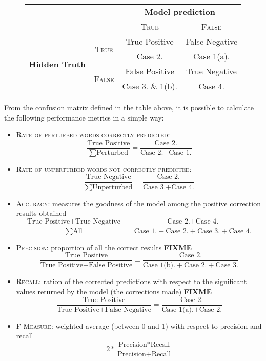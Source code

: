 \begin{figure}[H]
	\centering
	\begin{tabular}{lc|cc}
		\toprule
		& & \multicolumn{2}{c}{\textbf{Model prediction}}\\
		& & \textsc{True}  & \textsc{False} \\
		\midrule
		\multirow{4}{*}{\textbf{Hidden Truth}} 
		& \multirow{2}{*}{\textsc{True}}   & True Positive & False Negative	\\ 
			& & Case 2. & Case 1(a).	\\ 
		& \multirow{2}{*}{\textsc{False}}  & False Positive & True Negative	\\
		& &  Case 3. \& 1(b).  & Case 4.	\\ 
		\bottomrule
	\end{tabular}
	\label{tab:confmat}
\end{figure}

From the confusion matrix defined in the table above, it is possible to calculate the following performance 
metrics in a simple way:
\begin{itemize}
	\item \textsc{Rate of perturbed words correctly predicted}:
	\[ \frac{\mbox{True Positive}}{\sum \mbox{Perturbed}} = \frac{\mbox{Case 2.}}{\mbox{Case 2.} + \mbox{Case 
	1.}}\]
	\item \textsc{Rate of unperturbed words not correctly predicted}:
	\[ \frac{\mbox{True Negative}}{\sum \mbox{Unperturbed}} = \frac{\mbox{Case 2.}}{\mbox{Case 3.} + 
	\mbox{Case 4.}}\]
	\item \textsc{Accuracy}: measures the goodness of the model among the positive correction results obtained
	\[ \frac{\mbox{True Positive} + \mbox{True Negative}}{\sum \mbox{All}} = \frac{\mbox{Case 2.} + \mbox{Case 
	4.}}{\mbox{Case 1.} + \mbox{Case 2.} + \mbox{Case 3.} + \mbox{Case 4.}}\]
	\item \textsc{Precision}: proportion of all the correct results \textbf{FIXME}
		\[ \frac{\mbox{True Positive}}{\mbox{True Positive} + \mbox{False Positive}} = \frac{\mbox{Case 
		2.}}{\mbox{Case 1(b).} + \mbox{Case 2.} + \mbox{Case 3.}}\]
	\item \textsc{Recall}: ration of the corrected predictions with respect to the significant values returned by the 
	model (the corrections made) \textbf{FIXME}
		\[ \frac{\mbox{True Positive}}{\mbox{True Positive} + \mbox{False Negative}} = \frac{\mbox{Case 
		2.}}{\mbox{Case 1(a).} + \mbox{Case 2.}}\]
	\item \textsc{F-Measure}: weighted average (between 0 and 1) with respect to precision and recall
			\[ 2 * \frac{\mbox{Precision} * \mbox{Recall}}{\mbox{Precision} + \mbox{Recall}} \]
\end{itemize}

